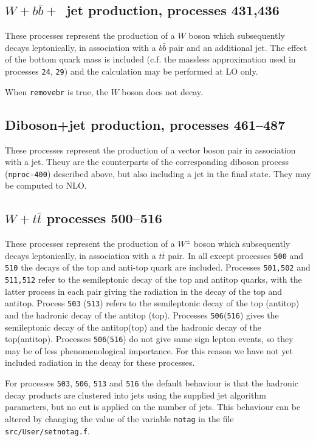 \subsection{$W+b{\bar b}+$~jet production, processes 431,436}
\label{subsec:wbbjetmassive}

These processes represent the production of a $W$ boson which subsequently
decays leptonically, in association with a $b{\bar b}$ pair and an
additional jet. The effect of the bottom quark mass is included (c.f. the massless approximation
used in processes {\tt 24}, {\tt 29})
and the calculation may be performed at LO only.

When {\tt removebr} is true, the $W$ boson does not decay.

\subsection{Diboson+jet production, processes 461--487}
\label{subsec:dibosonjet}

These processes represent the production of a vector boson pair in association
with a jet.  Theuy are the counterparts of the corresponding diboson process
(\texttt{nproc-400}) described above, but also including a jet in the final
state.  They may be computed to NLO.

\subsection{$W+t{\bar t}$ processes 500--516}
\label{subsec:wttdecay}

These processes represent the production of a $W^\pm$ boson which subsequently
decays leptonically, in association with a $t{\bar t}$ pair. In all except processes 
{\tt 500} and {\tt 510} the decays of the top and anti-top quark are included.
Processes {\tt 501,502} and {\tt 511,512} refer to the semileptonic decay of the top and antitop quarks,
with the latter process in each pair giving the radiation in the decay of the top and antitop.
Process {\tt 503} ({\tt 513}) refers to the semileptonic decay of the top (antitop)
and the hadronic decay of the antitop (top). Processes {\tt 506}({\tt 516}) gives the semileptonic
decay of the antitop(top) and the hadronic decay of the top(antitop).  Processes {\tt 506}({\tt 516}) 
do not give same sign lepton events, so they may be of less phenomenological importance. For this reason 
we have not yet included radiation in the decay for these processes. 

For processes {\tt 503}, {\tt 506}, {\tt 513}
and {\tt 516} the default behaviour is that the hadronic decay products
are clustered into jets using the supplied jet
algorithm parameters, but no cut is applied on the number of jets.
This behaviour can be altered by changing the value of the
variable {\tt notag} in the file {\tt src/User/setnotag.f}.

